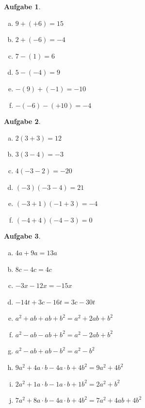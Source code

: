 \documentclass[12pt,fleqn]{article}
\theoremstyle{aufg}
\newtheorem{aufgabe}{Aufgabe}
\theoremstyle{bsp}
\begin{document}
 
    \begin{flushleft}
\begin{aufgabe} ~ \\ 
\begin{multicols}{3} 
\begin{enumerate}[a)] 
\item 
$9+(+6)=15$
\item 
$2+(-6)=-4$
\item 
$7-(1)=6$
\item 
$5-(-4)=9$
\item 
$-(9)+(-1)=-10$
\item 
$-(-6)-(+10)=-4$
\end{enumerate} 
\end{multicols} 
\end{aufgabe} 
\begin{aufgabe} ~ \\ 
\begin{multicols}{3} 
\begin{enumerate}[a)] 
\item 
$2(3+3)=12$
\item 
$3(3-4)=-3$
\item 
$4(-3-2)=-20$
\item 
$(-3)(-3-4)=21$
\item 
$(-3+1)(-1+3)=-4$
\item 
$(-4+4)(-4-3)=0$
\end{enumerate} 
\end{multicols} 
\end{aufgabe} 
\begin{aufgabe} ~ \\ 
\begin{multicols}{2} 
\begin{enumerate}[a)] 
\item 
$4a+9a=13 a$
\item 
$8c-4c=4 c$
\item 
$-3x-12x=- 15 x$
\item 
$-14t+3c-16t=3 c - 30 t$
\item 
$a^2+ab+ab+b^2=a^{2} + 2 a b + b^{2}$
\item 
$a^2-ab-ab+b^2=a^{2} - 2 a b + b^{2}$
\item 
$a^2-ab+ab-b^2=a^{2} - b^{2}$
\item 
$9a^2+4a\cdot b-4a\cdot b+4b^2=9 a^{2} + 4 b^{2}$
\item 
$2a^2+1a\cdot b-1a\cdot b+1b^2=2 a^{2} + b^{2}$
\item 
$7a^2+8a\cdot b-4a\cdot b+4b^2=7 a^{2} + 4 a b + 4 b^{2}$

\end{enumerate}
\end{multicols}
\end{aufgabe}
\end{flushleft}
\end{document}
